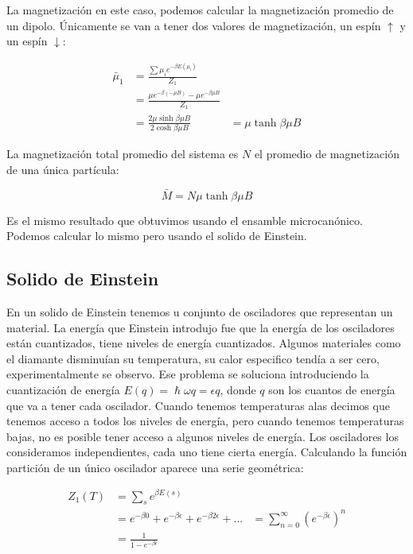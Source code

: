 \documentclass[11pt,fleqn]{book}
\begin{document}
La magnetización en este caso, podemos calcular la magnetización promedio de un dipolo. Únicamente se van a tener dos valores de magnetización, un espín $\uparrow$ y un espín $\downarrow$:

\begin{equation}
\begin{split}
    \bar{\mu}_{1}&=\frac{\sum\mu_{i}e^{-\beta E(\mu_{i})}}{Z_{1}}\\
    &=\frac{\mu e^{-\beta(-\mu B)}-\mu e^{-\beta\mu B}}{Z_{1}}\\
    &=\frac{2\mu \sinh{\beta\mu B}}{2 \cosh{\beta\mu B}}
    &=\mu\tanh{\beta\mu B}
\end{split}
    \label{Eq. 4.27}
\end{equation}

La magnetización total promedio del sistema es $N$ el promedio de magnetización de una única partícula:

\begin{equation}
    \bar{M}=N\mu\tanh{\beta\mu B}
    \label{Eq. 4.28}
\end{equation}

Es el mismo resultado que obtuvimos usando el ensamble microcanónico. Podemos calcular lo mismo pero usando el solido de Einstein.

\subsection{Solido de Einstein}

En un solido de Einstein tenemos u conjunto de osciladores que representan un material. La energía que Einstein introdujo fue que la energía de los osciladores están cuantizados, tiene niveles de energía cuantizados. Algunos materiales como el diamante disminuían su temperatura, su calor especifico tendía a ser cero, experimentalmente se observo. Ese problema se soluciona introduciendo la cuantización de energía $E(q)=\hslash\omega q=\epsilon q$, donde $q$ son los cuantos de energía que va a tener cada oscilador. Cuando tenemos temperaturas alas decimos que tenemos acceso a todos los niveles de energía, pero cuando tenemos temperaturas bajas, no es posible tener acceso a algunos niveles de energía. Los osciladores los consideramos independientes, cada uno tiene cierta energía. Calculando la función partición de un único oscilador aparece una serie geométrica:

\begin{equation}
\begin{split}
        Z_{1}(T)&=\sum_{s}e^{\beta E(s)}\\
        &=e^{-\beta0}+e^{-\beta\epsilon}+e^{-\beta2\epsilon}+...
        &=\sum_{n=0}^{\infty}(e^{-\beta\epsilon})^{n}\\
        &=\frac{1}{1-e^{-\beta\epsilon}}
\end{split}
    \label{Eq. 4.29}
\end{equation}
\end{document}
